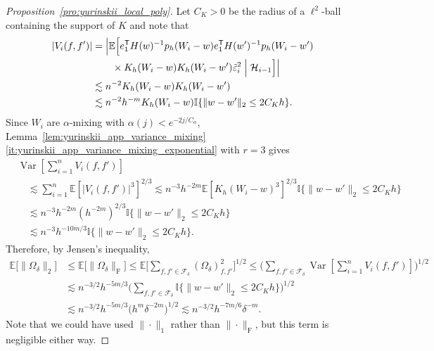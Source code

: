 \documentclass[11pt,lof]{puthesis}
\newcommand{\E}{\ensuremath{\mathbb{E}}}
\newcommand{\I}{\ensuremath{\mathbb{I}}}
\newcommand{\rF}{\ensuremath{\mathrm{F}}}
\newcommand{\cH}{\ensuremath{\mathcal{H}}}
\newcommand{\cF}{\ensuremath{\mathcal{F}}}
\newcommand{\T}{\ensuremath{\mathsf{T}}}
\DeclareMathOperator{\Var}{Var}
\theoremstyle{break}
\theoremstyle{proof}
\newtheorem{proof}{Proof}
\begin{document}
\begin{proof}[Proposition~\ref{pro:yurinskii_local_poly}]
  Let $C_K>0$ be the radius of a $\ell^2$-ball
  containing the support of $K$
  and note that
  \begin{align*}
    \left|
      V_i(f,f')
    \right|
    &=
    \Big|
    \E\Big[
      e_1^\T H(w)^{-1}
      p_h(W_i-w)
      e_1^\T H(w')^{-1}
      p_h(W_i-w') \\
      &\qquad\times
      K_h(W_i-w)
      K_h(W_i-w')
      \tilde\varepsilon_i^2
      \Bigm| \cH_{i-1}
    \Big]
    \Big| \\
    &\lesssim
    n^{-2}
    K_h(W_i-w)
    K_h(W_i-w') \\
    &\lesssim
    n^{-2}
    h^{-m}
    K_h(W_i-w)
    \I\{\|w-w'\|_2 \leq 2 C_K h\}.
  \end{align*}
  Since $W_i$ are $\alpha$-mixing
  with $\alpha(j) < e^{-2j / C_\alpha}$,
  Lemma~\ref{lem:yurinskii_app_variance_mixing}%
  \ref{it:yurinskii_app_variance_mixing_exponential}
  with $r=3$ gives
  \begin{align*}
    &\Var\left[
      \sum_{i=1}^n V_i(f,f')
    \right] \\
    &\quad\lesssim
    \sum_{i=1}^n
    \E\left[
      |V_i(f,f')|^3
    \right] ^{2/3}
    \lesssim
    n^{-3} h^{-2m}
    \E\left[
      K_h(W_i-w)^3
    \right] ^{2/3}
    \I\{\|w-w'\|_2 \leq 2 C_K h\} \\
    &\quad\lesssim
    n^{-3} h^{-2m}
    (h^{-2m})^{2/3}
    \I\{\|w-w'\|_2 \leq 2 C_K h\} \\
    &\quad\lesssim
    n^{-3} h^{-10m/3}
    \I\{\|w-w'\|_2 \leq 2 C_K h\}.
  \end{align*}
  Therefore, by Jensen's inequality,
  \begin{align*}
    \E\big[ \|\Omega_\delta\|_2 \big]
    &\leq
    \E\big[ \|\Omega_\delta\|_\rF \big]
    \leq
    \E\Bigg[
      \sum_{f,f' \in \cF_\delta}
      (\Omega_\delta)_{f,f'}^2
    \Bigg]^{1/2}
    \leq
    \Bigg(
      \sum_{f,f' \in \cF_\delta}
      \Var\left[
        \sum_{i=1}^n V_i(f,f')
      \right]
    \Bigg)^{1/2} \\
    &\lesssim
    n^{-3/2} h^{-5m/3}
    \Bigg(
      \sum_{f,f' \in \cF_\delta}
      \I\{\|w-w'\|_2 \leq 2 C_K h\}
    \Bigg)^{1/2} \\
    &\lesssim
    n^{-3/2} h^{-5m/3}
    \big(h^{m} \delta^{-2m} \big)^{1/2}
    \lesssim
    n^{-3/2}
    h^{-7m/6}
    \delta^{-m}.
  \end{align*}
  Note that we could have used
  $\|\cdot\|_1$ rather than $\|\cdot\|_\rF$,
  but this term is negligible either way.


\end{proof}
\end{document}
